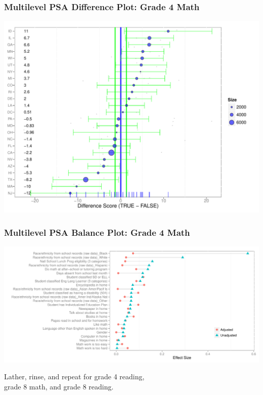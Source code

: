 \documentclass[10pt,handout,mathserif]{beamer}
\begin{document}
\begin{frame}[c]
	\frametitle{Multilevel PSA Difference Plot: Grade 4 Math}
	\begin{center}
	\includegraphics[height=\textheight,keepaspectratio]{../Figures2009/g4math-mlpsa-ctree-diff}
	\end{center}
\end{frame}

\begin{frame}[c]
	\frametitle{Multilevel PSA Balance Plot: Grade 4 Math}
	\begin{center}
	\includegraphics[height=\textheight,keepaspectratio]{../Figures2009/g4math-mlpsa-ctree-balance}
	\end{center}
\end{frame}

\begin{frame}[c]
    \begin{center}
    Lather, rinse, and repeat for grade 4 reading,\\grade 8 math, and grade 8 reading.
    \end{center}
\end{frame}
\end{document}
